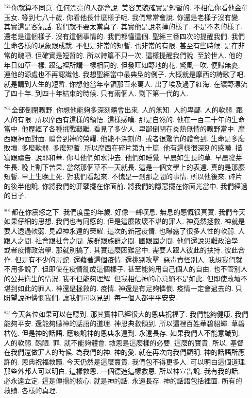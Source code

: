 \documentclass{book}
\begin{document}
$^{721}$你就算不同意.
任何漂亮的人都會說.
美容美貌確實是短暫的.
不相信你看他金童玉女.
等到七八十歲.
你看他長什麼樣子呢.
我們常常會說.
你還是老樣子沒有變.
其實這是客氣話.
我們就不要太當真了.
其實他是說老掉的樣子.
不是不老的樣子.
還老是這個樣子.
沒有這個事情的.
我們都懂這個.
聖經三番四次的提醒我們.
我們生命各樣的現象跟成就.
不但是非常的短暫.
也非常的有限.
甚至有些時候.
是在非常的醜陋.
但確實是短暫的.
所以詩篇不只一次.
這樣提醒我們說.
至於世人.
他的年日如草一樣.
跟這裡所講一樣相同的.
但發旺如野地的花.
驚風一吹.
便歸無憂.
連他的源處也不再認識他.
我想聖經當中最典型的例子.
大概就是摩西的詩歌了吧.
就是講到人生的短暫.
你想他當年率領那百來萬人.
出了埃及過了紅海.
在曠野漂流了四十年.
到四十年結束的時候.
只有兩個人.
剩下第一代的人.

$^{761}$全部倒閉曠野.
你想他能夠多深刻體會出來.
人的無知.
人的卑鄙.
人的軟弱.
跟人的有限.
所以摩西有這樣的領悟.
這樣感嘆.
那是自然的.
他在一百二十年的生命當中.
他歷經了各種挑戰艱難.
看見了多少人.
卑鄙倒閉在炎熱無情的曠野當中.
摩西跟神面對面.
體會到神的榮耀.
他能不深刻的.
或者很驚慌的體會到.
生命是多麼敗壞.
多麼軟弱.
多麼短暫.
所以摩西在碎片第九十篇.
他有這樣很深刻的感嘆.
描寫跟禱告.
說耶和華.
你叫他們如水沖去.
他們如睡覺.
早晨如生長的草.
早晨發芽生長.
晚上割下苦果.
當然那個草不一天就長.
這是一個文學上的表達.
真的是那麼短暫.
早上生晚上死.
對我們看起來.
不愧是一剎那之間的事情.
所以他後來.
碎片的後半他說.
你將我們的罪孽擺在你面前.
將我們的隱惡擺在你面光當中.
我們經過的日子.

$^{801}$都在你震怒之下.
我們度盡的年歲.
好像一聲嘆息.
無息的感慨很真實.
我們今天如果仔細的思想.
我們也有同感的.
但是這麼敗壞不堪的罪人.
神竟然拯救.
神就是要人透過軟弱.
見證神永遠的榮耀.
這次的新冠疫情.
也曝露了很多人性的軟弱.
人跟人之間.
社會跟社會之間.
族群跟族群之間.
國跟國之間.
他們還說災難政治學.
或者疫情政治學.
那就別搞了.
其實這麼困難當中.
需要人跟人彼此的扶持.
彼此合作.
但是有不少的毒蛇.
還藉著這個疫情.
還挑剔攻擊.
惡毒責怪別人.
我想我們就不用多說了.
但即使在疫情亂成這個樣子.
甚至能夠用自己個人的自由.
也不管別人的公共衛生的情況.
我不但能夠理解.
但我相信神的心意絕不是如此.
但即使敗壞不堪到如此的罪人.
神還是拯救的.
疫情.
神還是有足夠憐憫.
疫情一定會過去的.
只盼望說神憐憫我們.
讓我們可以見到.
每一個人都平平安安.

$^{841}$今天各位如果可以在聽到.
那其實神已經很大的恩典祝福了.
我們能夠健康.
我們能夠平安.
還能夠聽神的話語的道理.
神恩典救領到.
所以這裡百姓華碧貂蟬.
草碧枯乾.
但是神的話語.
應該說神的恩典永遠到.
永遠長存.
如果我們人不能意識到.
人的軟弱.
醜陋.
罪.
就不能夠體會.
救恩是這麼樣的必要.
這麼的寶貴.
所以.
基督在我們還做罪人的時候.
為我們的神.
神的愛.
就在再次向我們顯明.
神的話語所應許的.
恩典祝福救贖.
今天仍然是這麼寶貴.
我們包不得更多人.
可以明白這個道理.
那些外邦人可以明白.
這樣救恩.
一個德造這樣救恩.
所以神宣告說.
我有我的話.
必永遠立定.
這是傳揚的核心.
就是神的話.
永遠長存.
神的話語包括裡面.
所有的救贖.
各樣的真理.
\end{document}
